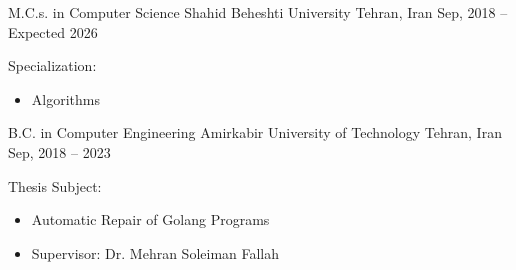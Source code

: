 

\begin{cventries}

  \cventry 
  {M.C.s. in Computer Science} %
  {Shahid Beheshti University} %
  {Tehran, Iran} %
  {Sep, 2018 – Expected 2026} %
  {
      \begin{cvitems}
      \item {Specialization:}
      \begin{itemize}
      \item {Algorithms}
      \end{itemize}
      \end{cvitems}
  }
  \vspace{0.5cm}

  \cventry 
    {B.C. in Computer Engineering} %
    {Amirkabir University of Technology} %
    {Tehran, Iran} %
    {Sep, 2018 – 2023} %
    {
        \begin{cvitems}
        \item {Thesis Subject:}
        \begin{itemize}
        \item {Automatic Repair of Golang Programs}
        \item {Supervisor: Dr. Mehran Soleiman Fallah}
        \end{itemize}
        \end{cvitems}
    }

\end{cventries}

